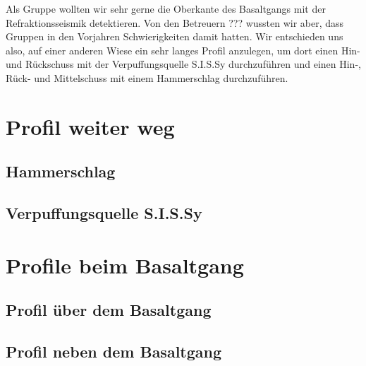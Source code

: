 Als Gruppe wollten wir sehr gerne die Oberkante des Basaltgangs mit der Refraktionsseismik detektieren. Von den Betreuern ??? wussten wir aber, dass Gruppen in den Vorjahren Schwierigkeiten damit hatten. Wir entschieden uns also, auf einer anderen Wiese ein sehr langes Profil anzulegen, um dort einen Hin- und Rückschuss mit der Verpuffungsquelle S.I.S.Sy durchzuführen und einen Hin-, Rück- und Mittelschuss mit einem Hammerschlag durchzuführen.

\section{Profil weiter weg}

\subsection{Hammerschlag}

\subsection{Verpuffungsquelle S.I.S.Sy}

\section{Profile beim Basaltgang}

\subsection{Profil über dem Basaltgang} %

\subsection{Profil neben dem Basaltgang}